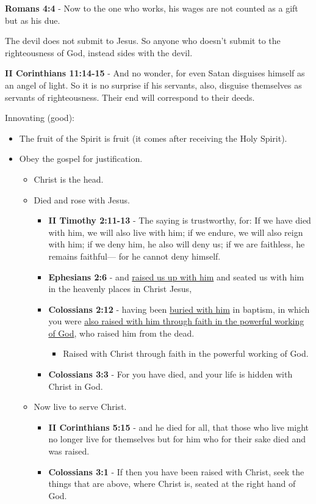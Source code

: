 \documentclass[11pt]{article}
\begin{document}
\textbf{Romans 4:4} - Now to the one who works, his wages are not counted as a gift but as his due.

The devil does not submit to Jesus. So anyone who doesn't submit to the righteousness of God, instead sides with the devil.

\textbf{II Corinthians 11:14-15} - And no wonder, for even Satan disguises himself as an angel of light. So it is no surprise if his servants, also, disguise themselves as servants of righteousness. Their end will correspond to their deeds.

Innovating (good):
\begin{itemize}
\item The fruit of the Spirit is fruit (it comes after receiving the Holy Spirit).
\item Obey the gospel for justification.
\begin{itemize}
\item Christ is the head.
\item Died and rose with Jesus.
\begin{itemize}
\item \textbf{II Timothy 2:11-13} - The saying is trustworthy, for: If we have died with him, we will also live with him; if we endure, we will also reign with him; if we deny him, he also will deny us; if we are faithless, he remains faithful— for he cannot deny himself.
\item \textbf{Ephesians 2:6} - and \uline{raised us up with him} and seated us with him in the heavenly places in Christ Jesus,
\item \textbf{Colossians 2:12} - having been \uline{buried with him} in baptism, in which you were \uline{also raised with him through faith in the powerful working of God}, who raised him from the dead.
\begin{itemize}
\item Raised with Christ through faith in the powerful working of God.
\end{itemize}
\item \textbf{Colossians 3:3} - For you have died, and your life is hidden with Christ in God.
\end{itemize}
\item Now live to serve Christ.
\begin{itemize}
\item \textbf{II Corinthians 5:15} - and he died for all, that those who live might no longer live for themselves but for him who for their sake died and was raised.
\item \textbf{Colossians 3:1} - If then you have been raised with Christ, seek the things that are above, where Christ is, seated at the right hand of God.

\end{itemize}
\end{itemize}
\end{itemize}
\end{document}
